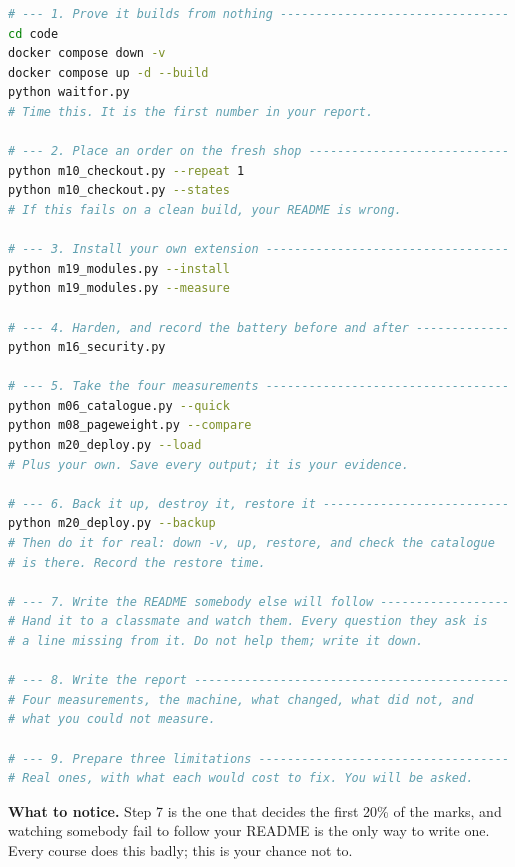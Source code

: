 \begin{lab}[Ship it]
\begin{lstlisting}[language=bash]
# --- 1. Prove it builds from nothing --------------------------------
cd code
docker compose down -v
docker compose up -d --build
python waitfor.py
# Time this. It is the first number in your report.

# --- 2. Place an order on the fresh shop ----------------------------
python m10_checkout.py --repeat 1
python m10_checkout.py --states
# If this fails on a clean build, your README is wrong.

# --- 3. Install your own extension ----------------------------------
python m19_modules.py --install
python m19_modules.py --measure

# --- 4. Harden, and record the battery before and after -------------
python m16_security.py

# --- 5. Take the four measurements ----------------------------------
python m06_catalogue.py --quick
python m08_pageweight.py --compare
python m20_deploy.py --load
# Plus your own. Save every output; it is your evidence.

# --- 6. Back it up, destroy it, restore it --------------------------
python m20_deploy.py --backup
# Then do it for real: down -v, up, restore, and check the catalogue
# is there. Record the restore time.

# --- 7. Write the README somebody else will follow ------------------
# Hand it to a classmate and watch them. Every question they ask is
# a line missing from it. Do not help them; write it down.

# --- 8. Write the report --------------------------------------------
# Four measurements, the machine, what changed, what did not, and
# what you could not measure.

# --- 9. Prepare three limitations -----------------------------------
# Real ones, with what each would cost to fix. You will be asked.
\end{lstlisting}

\smallskip
\textbf{What to notice.} Step 7 is the one that decides the first 20\% of the
marks, and watching somebody fail to follow your README is the only way to
write one. Every course does this badly; this is your chance not to.
\end{lab}

